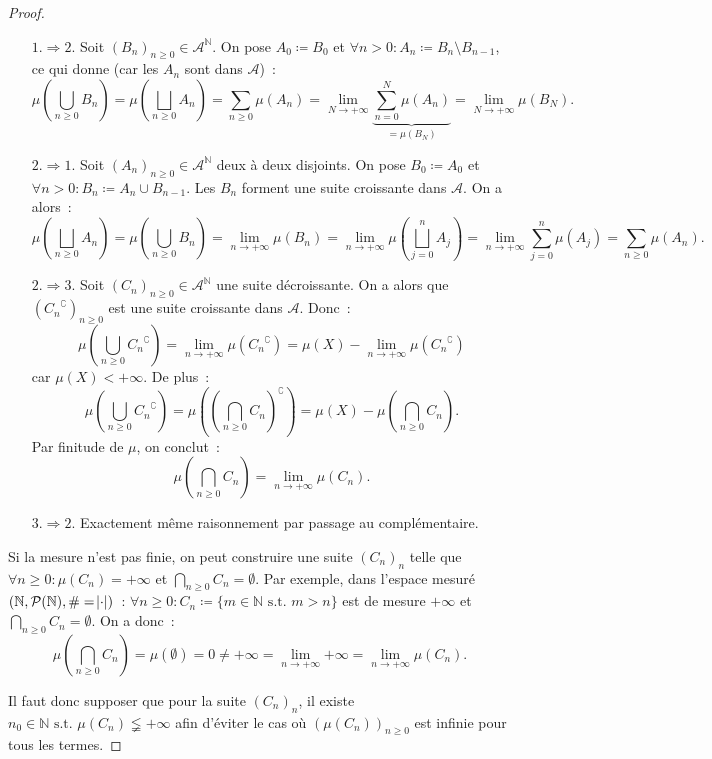 \documentclass{article}
\newcommand{\pinfty}{{+\infty}}
\newcommand{\st}{\text{ s.t. }}
\newcommand{\C}{\complement}
\newcommand{\N}{{\mathbb N}}
\begin{document}
\begin{proof}~
\begin{itemize}
	\item[\underline {$1. \Rightarrow 2.$}] Soit $(B_n)_{n \geq 0} \in \mathcal A^\N$. On pose $A_0 \coloneqq B_0$ et $\forall n > 0 : A_n \coloneqq B_n \setminus B_{n-1}$,
	ce qui donne (car les $A_n$ sont dans $\mathcal A$)~:
	\[\mu\left(\bigcup_{n \geq 0}B_n\right) = \mu\left(\bigsqcup_{n \geq 0}A_n\right) = \sum_{n \geq 0}\mu(A_n)
	  = \lim_{N \to \pinfty}\underbrace {\sum_{n=0}^N\mu(A_n)}_{= \mu(B_N)} = \lim_{N \to \pinfty}\mu(B_N).\]
	\item[\underline {$2. \Rightarrow 1.$}] Soit $(A_n)_{n \geq 0} \in \mathcal A^\N$ deux à deux disjoints.
	On pose $B_0 \coloneqq A_0$ et $\forall n > 0 : B_n \coloneqq A_n \cup B_{n-1}$. Les $B_n$ forment une suite croissante dans $\mathcal A$. On a alors~:
	\[\mu\left(\bigsqcup_{n \geq 0}A_n\right) = \mu\left(\bigcup_{n \geq 0}B_n\right) = \lim_{n \to \pinfty}\mu(B_n) = \lim_{n \to \pinfty}\mu\left(\bigsqcup_{j=0}^nA_j\right)
	  = \lim_{n \to \pinfty}\sum_{j=0}^n\mu(A_j) = \sum_{n \geq 0}\mu(A_n).\]
	\item[\underline {$2. \Rightarrow 3.$}] Soit $(C_n)_{n \geq 0} \in \mathcal A^\N$ une suite décroissante. On a alors que $({C_n}^\C)_{n \geq 0}$ est une suite croissante dans
	$\mathcal A$. Donc~:
	\[\mu\left(\bigcup_{n \geq 0}{C_n}^\C\right) = \lim_{n \to \pinfty}\mu({C_n}^\C) = \mu(X) - \lim_{n \to \pinfty}\mu({C_n}^\C)\]
	car $\mu(X) < \pinfty$. De plus~:
	\[\mu\left(\bigcup_{n \geq 0}{C_n}^\C\right) = \mu\left(\left(\bigcap_{n \geq 0}C_n\right)^\C\right) = \mu(X) - \mu\left(\bigcap_{n \geq 0}C_n\right).\]
	Par finitude de $\mu$, on conclut~:
	\[\mu\left(\bigcap_{n \geq 0}C_n\right) = \lim_{n \to \pinfty}\mu(C_n).\]
	\item[\underline {$3. \Rightarrow 2.$}] Exactement même raisonnement par passage au complémentaire.
\end{itemize}

Si la mesure n'est pas finie, on peut construire une suite $(C_n)_n$ telle que $\forall n \geq 0 : \mu(C_n) = \pinfty$ et $\bigcap_{n \geq 0}C_n = \emptyset$. Par exemple,
dans l'espace mesuré $(\N, \mathcal P(\N), \# = \abs \cdot)$~: $\forall n \geq 0 : C_n \coloneqq \{m \in \N \st m > n\}$ est de mesure $\pinfty$ et
$\bigcap_{n \geq 0}C_n = \emptyset$. On a donc~:
\[\mu\left(\bigcap_{n \geq 0}C_n\right) = \mu(\emptyset) = 0 \neq \pinfty = \lim_{n \to \pinfty}\pinfty = \lim_{n \to \pinfty}\mu(C_n).\]

Il faut donc supposer que pour la suite $(C_n)_n$, il existe $n_0 \in \N \st \mu(C_n) \lneqq \pinfty$ afin d'éviter le cas où $(\mu(C_n))_{n \geq 0}$ est infinie pour tous les termes.
\end{proof}
\end{document}
